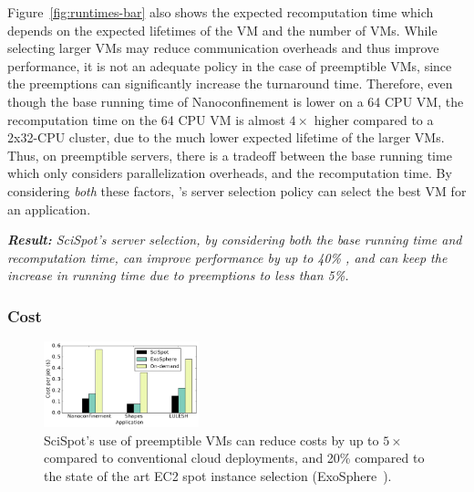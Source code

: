 Figure~\ref{fig:runtimes-bar} also shows the expected recomputation time which depends on the expected lifetimes of the VM and the number of VMs. %
While selecting larger VMs may reduce communication overheads and thus improve performance, it is not an adequate policy in the case of preemptible VMs, since the preemptions can significantly increase the turnaround time.
Therefore, even though the base running time of Nanoconfinement is lower on a 64 CPU VM, the recomputation time on the 64 CPU VM is almost $4\times$ higher compared to a 2x32-CPU cluster,  due to the much lower expected lifetime of the larger VMs. 
Thus, on preemptible servers, there is a tradeoff between the base running time which only considers parallelization overheads, and the recomputation time.
By considering \emph{both} these factors, \sysname's server selection policy can select the best VM for an application. 


\noindent \emph{\textbf{Result:} SciSpot's server selection, by considering both the base running time and recomputation time, can improve performance by up to 40\% , and can keep the increase in running time due to preemptions to less than 5\%.}

\subsubsection{Cost}

\begin{figure}
  \centering
  \includegraphics[width=0.4\textwidth]{../graphs/cost-vs-exosphere.pdf}
  \vspace*{\myfigspace}
  \caption{SciSpot's use of preemptible VMs can reduce costs by up to $5\times$ compared to conventional cloud deployments, and 20\% compared to the state of the art EC2 spot instance selection (ExoSphere~\cite{exosphere}).}
  \label{fig:cost-only-bar}
    \vspace*{\myfigspace}
\end{figure}

